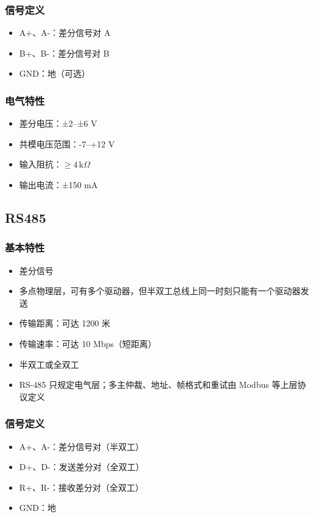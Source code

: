 \subsubsection{信号定义}

\begin{itemize}
  \item A+、A-：差分信号对 A
  \item B+、B-：差分信号对 B
  \item GND：地（可选）
\end{itemize}

\subsubsection{电气特性}

\begin{itemize}
  \item 差分电压：±2--±6 V
  \item 共模电压范围：-7--+12 V
  \item 输入阻抗：$\geq 4\,\mathrm{k}\Omega$
  \item 输出电流：±150 mA
\end{itemize}

\subsection{RS485}

\subsubsection{基本特性}

\begin{itemize}
  \item 差分信号
  \item 多点物理层，可有多个驱动器，但半双工总线上同一时刻只能有一个驱动器发送
  \item 传输距离：可达 1200 米
  \item 传输速率：可达 10 Mbps（短距离）
  \item 半双工或全双工
  \item RS-485 只规定电气层；多主仲裁、地址、帧格式和重试由 Modbus 等上层协议定义
\end{itemize}

\subsubsection{信号定义}

\begin{itemize}
  \item A+、A-：差分信号对（半双工）
  \item D+、D-：发送差分对（全双工）
  \item R+、R-：接收差分对（全双工）
  \item GND：地
\end{itemize}

